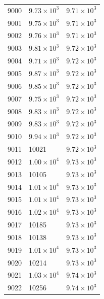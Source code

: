 \begin{table}[H]
\begin{tabular}{lll}
9000 & $\displaystyle 9.73 \times 10^{3}$ & $\displaystyle 9.71 \times 10^{3}$ \\
9001 & $\displaystyle 9.75 \times 10^{3}$ & $\displaystyle 9.71 \times 10^{3}$ \\
9002 & $\displaystyle 9.76 \times 10^{3}$ & $\displaystyle 9.71 \times 10^{3}$ \\
9003 & $\displaystyle 9.81 \times 10^{3}$ & $\displaystyle 9.72 \times 10^{3}$ \\
9004 & $\displaystyle 9.71 \times 10^{3}$ & $\displaystyle 9.72 \times 10^{3}$ \\
9005 & $\displaystyle 9.87 \times 10^{3}$ & $\displaystyle 9.72 \times 10^{3}$ \\
9006 & $\displaystyle 9.85 \times 10^{3}$ & $\displaystyle 9.72 \times 10^{3}$ \\
9007 & $\displaystyle 9.75 \times 10^{3}$ & $\displaystyle 9.72 \times 10^{3}$ \\
9008 & $\displaystyle 9.83 \times 10^{3}$ & $\displaystyle 9.72 \times 10^{3}$ \\
9009 & $\displaystyle 9.83 \times 10^{3}$ & $\displaystyle 9.72 \times 10^{3}$ \\
9010 & $\displaystyle 9.94 \times 10^{3}$ & $\displaystyle 9.72 \times 10^{3}$ \\
9011 & 10021 & $\displaystyle 9.72 \times 10^{3}$ \\
9012 & $\displaystyle 1.00 \times 10^{4}$ & $\displaystyle 9.73 \times 10^{3}$ \\
9013 & 10105 & $\displaystyle 9.73 \times 10^{3}$ \\
9014 & $\displaystyle 1.01 \times 10^{4}$ & $\displaystyle 9.73 \times 10^{3}$ \\
9015 & $\displaystyle 1.01 \times 10^{4}$ & $\displaystyle 9.73 \times 10^{3}$ \\
9016 & $\displaystyle 1.02 \times 10^{4}$ & $\displaystyle 9.73 \times 10^{3}$ \\
9017 & 10185 & $\displaystyle 9.73 \times 10^{3}$ \\
9018 & 10138 & $\displaystyle 9.73 \times 10^{3}$ \\
9019 & $\displaystyle 1.01 \times 10^{4}$ & $\displaystyle 9.73 \times 10^{3}$ \\
9020 & 10214 & $\displaystyle 9.73 \times 10^{3}$ \\
9021 & $\displaystyle 1.03 \times 10^{4}$ & $\displaystyle 9.74 \times 10^{3}$ \\
9022 & 10256 & $\displaystyle 9.74 \times 10^{3}$ \\

\end{tabular}
\end{table}
